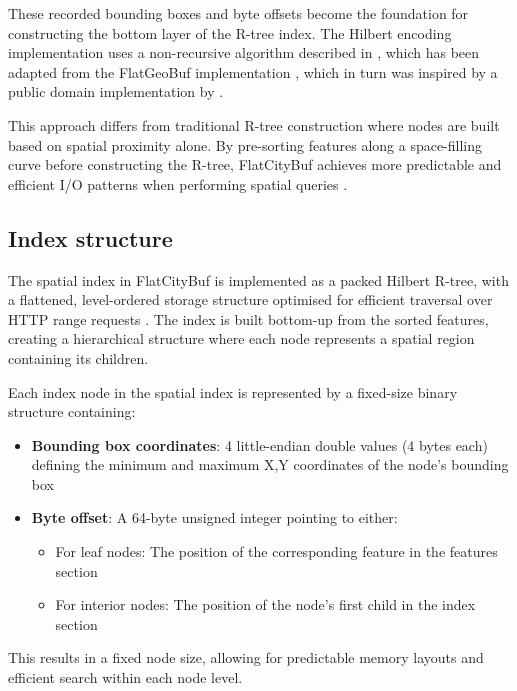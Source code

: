 These recorded bounding boxes and byte offsets become the foundation for constructing the bottom layer of the R-tree index. The Hilbert encoding implementation uses a non-recursive algorithm described in \citet{hacker_delight_2012}, which has been adapted from the FlatGeoBuf implementation \citep{flatgeobuf_github}, which in turn was inspired by a public domain implementation by \citet{rawrunprotected_2016}.

This approach differs from traditional R-tree construction where nodes are built based on spatial proximity alone. By pre-sorting features along a space-filling curve before constructing the R-tree, FlatCityBuf achieves more predictable and efficient I/O patterns when performing spatial queries \citep{horance_2022_overview}.

\subsection{Index structure}
\label{methodology:spatial_index:index_structure}

The spatial index in FlatCityBuf is implemented as a packed Hilbert R-tree, with a flattened, level-ordered storage structure optimised for efficient traversal over HTTP range requests \citep{horance_2022_detail}. The index is built bottom-up from the sorted features, creating a hierarchical structure where each node represents a spatial region containing its children.

Each index node in the spatial index is represented by a fixed-size binary structure containing:

\begin{itemize}
  \item \textbf{Bounding box coordinates}: 4 little-endian double values (4 bytes each) defining the minimum and maximum X,Y coordinates of the node's bounding box
  \item \textbf{Byte offset}: A 64-byte unsigned integer pointing to either:
    \begin{itemize}
      \item For leaf nodes: The position of the corresponding feature in the features section
      \item For interior nodes: The position of the node's first child in the index section
    \end{itemize}
\end{itemize}

This results in a fixed node size, allowing for predictable memory layouts and efficient search within each node level.

